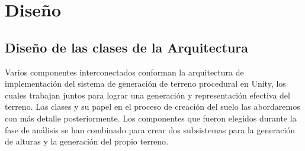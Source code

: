 \section{Diseño}

\subsection{Diseño de las clases de la Arquitectura}

Varios componentes interconectados conforman la arquitectura de implementación del sistema de generación de terreno procedural en Unity, los cuales trabajan juntos para lograr una generación y representación efectiva del terreno. Las clases y su papel en el proceso de creación del suelo las abordaremos con más detalle posteriormente. Los componentes que fueron elegidos durante la fase de análisis se han combinado para crear dos subsistemas para la generación de alturas y la generación del propio terreno.

